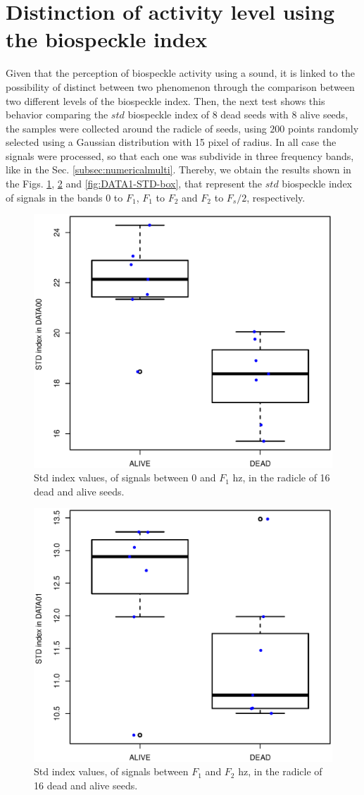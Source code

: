 \documentclass[review]{elsarticle}
\begin{document}
\section{Distinction of activity level using the biospeckle index} 
Given that the perception of biospeckle activity using a sound, it is linked to the possibility
of distinct between two phenomenon through the comparison between two different levels of the biospeckle index. 
Then, the next test shows this behavior comparing the $std$ biospeckle index of 8 dead seeds
with 8 alive seeds, the samples were collected around the radicle of seeds, using $200$ points 
randomly selected using a Gaussian distribution with 15 pixel of radius. In all case the signals
were processed, so that each one was subdivide in three frequency bands, like in the 
Sec. \ref{subsec:numericalmulti}. Thereby, we obtain the results shown in the Figs. \ref{fig:DATA00-STD-box},
\ref{fig:DATA01-STD-box} and \ref{fig:DATA1-STD-box}, that represent the $std$ biospeckle index
of signals in the bands $0$ to $F_1$, $F_1$ to $F_2$ and $F_2$ to $F_s/2$, respectively.

\begin{figure}[ht!]
\centering
\includegraphics[width=0.6\columnwidth]{DATA00-STD-box.eps}
\caption{Std index values, of signals between $0$ and $F_1$ hz, in the radicle of 16 dead and alive seeds.}
\label{fig:DATA00-STD-box}
\end{figure}

\begin{figure}[ht!]
\centering
\includegraphics[width=0.6\columnwidth]{DATA01-STD-box.eps}
\caption{Std index values, of signals between $F_1$ and $F_2$ hz, in the radicle of 16 dead and alive seeds.}
\label{fig:DATA01-STD-box}
\end{figure}
\end{document}
